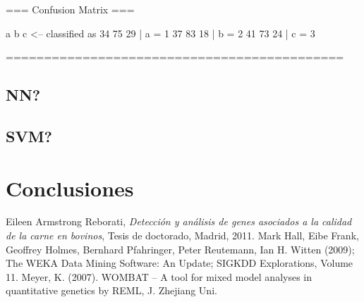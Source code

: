 \documentclass[12pt,a4paper,titlepage]{report}
\begin{document}
=== Confusion Matrix ===

  a  b  c   <-- classified as
 34 75 29 |  a = 1
 37 83 18 |  b = 2
 41 73 24 |  c = 3

============================================\\
	
\section{NN?}
	
\section{SVM?}

\chapter{Conclusiones}






\begin{thebibliography}{99}
\begin{small}

Eileen Armstrong Reborati, \emph{Detección y análisis de genes asociados a la calidad de la carne en bovinos}, Tesis de doctorado, Madrid, 2011.
Mark Hall, Eibe Frank, Geoffrey Holmes, Bernhard Pfahringer, Peter Reutemann, Ian H. Witten (2009); The WEKA Data Mining Software: An Update; SIGKDD Explorations, Volume 11.
Meyer, K. (2007). WOMBAT – A tool for mixed model analyses in quantitative genetics by REML, J. Zhejiang Uni.

\end{small}
\end{thebibliography}
\end{document}
